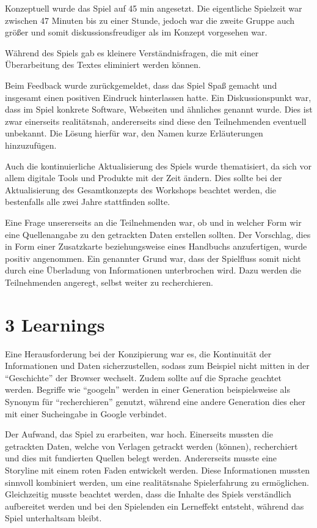 \documentclass[a4paper,
fontsize=11pt,
oneside,
numbers=noperiodatend,
parskip=half-,
bibliography=totoc,
final
]{scrartcl}
\begin{document}
Konzeptuell wurde das Spiel auf 45 min angesetzt. Die eigentliche
Spielzeit war zwischen 47 Minuten bis zu einer Stunde, jedoch war die
zweite Gruppe auch größer und somit diskussionsfreudiger als im Konzept
vorgesehen war.

Während des Spiels gab es kleinere Verständnisfragen, die mit einer
Überarbeitung des Textes eliminiert werden können.

Beim Feedback wurde zurückgemeldet, dass das Spiel Spaß gemacht und
insgesamt einen positiven Eindruck hinterlassen hatte. Ein
Diskussionspunkt war, dass im Spiel konkrete Software, Webseiten und
ähnliches genannt wurde. Dies ist zwar einerseits realitätsnah,
andererseits sind diese den Teilnehmenden eventuell unbekannt. Die
Lösung hierfür war, den Namen kurze Erläuterungen hinzuzufügen.

Auch die kontinuierliche Aktualisierung des Spiels wurde thematisiert,
da sich vor allem digitale Tools und Produkte mit der Zeit ändern. Dies
sollte bei der Aktualisierung des Gesamtkonzepts des Workshops beachtet
werden, die bestenfalls alle zwei Jahre stattfinden sollte.

Eine Frage unsererseits an die Teilnehmenden war, ob und in welcher Form
wir eine Quellenangabe zu den getrackten Daten erstellen sollten. Der
Vorschlag, dies in Form einer Zusatzkarte beziehungsweise eines
Handbuchs anzufertigen, wurde positiv angenommen. Ein genannter Grund
war, dass der Spielfluss somit nicht durch eine Überladung von
Informationen unterbrochen wird. Dazu werden die Teilnehmenden angeregt,
selbst weiter zu recherchieren.

\section{3 Learnings}\label{learnings}

Eine Herausforderung bei der Konzipierung war es, die Kontinuität der
Informationen und Daten sicherzustellen, sodass zum Beispiel nicht
mitten in der \enquote{Geschichte} der Browser wechselt. Zudem sollte
auf die Sprache geachtet werden. Begriffe wie \enquote{googeln} werden
in einer Generation beispielsweise als Synonym für
\enquote{recherchieren} genutzt, während eine andere Generation dies
eher mit einer Sucheingabe in Google verbindet.

Der Aufwand, das Spiel zu erarbeiten, war hoch. Einerseits mussten die
getrackten Daten, welche von Verlagen getrackt werden (können),
recherchiert und dies mit fundierten Quellen belegt werden. Andererseits
musste eine Storyline mit einem roten Faden entwickelt werden. Diese
Informationen mussten sinnvoll kombiniert werden, um eine realitätsnahe
Spielerfahrung zu ermöglichen. Gleichzeitig musste beachtet werden, dass
die Inhalte des Spiels verständlich aufbereitet werden und bei den
Spielenden ein Lerneffekt entsteht, während das Spiel unterhaltsam
bleibt.
\end{document}
